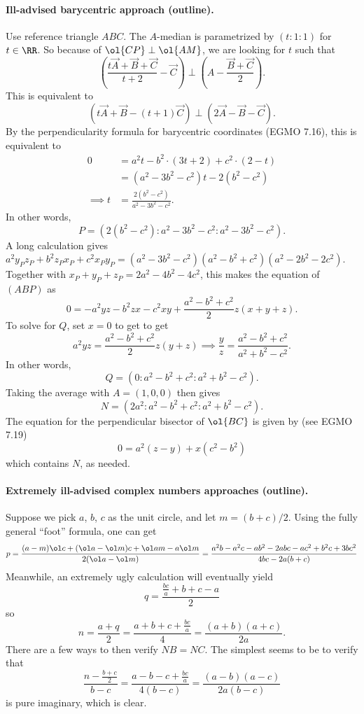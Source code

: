 \documentclass[11pt]{scrartcl}
\begin{document}
\paragraph{Ill-advised barycentric approach (outline).}
Use reference triangle $ABC$.
The $A$-median is parametrized by $(t:1:1)$ for $t \in \RR$.
So because of $\ol{CP} \perp \ol{AM}$, we are looking for $t$ such that
\[
  \left( \frac{t \vec A + \vec B + \vec C}{t+2} - \vec C \right)
  \perp \left( A - \frac{\vec B + \vec C}{2} \right).
\]
This is equivalent to
\[
  \left( t \vec A + \vec B - (t+1) \vec C \right)
  \perp \left( 2 \vec A - \vec B - \vec C \right).
\]
By the perpendicularity formula for barycentric coordinates (EGMO 7.16),
this is equivalent to
\begin{align*}
  0 &= a^2t - b^2 \cdot (3t+2) + c^2 \cdot (2-t) \\
  &= \left( a^2-3b^2-c^2 \right) t - 2(b^2-c^2) \\
  \implies t &= \frac{2(b^2-c^2)}{a^2-3b^2-c^2}.
\end{align*}
In other words,
\[ P = \left( 2(b^2-c^2) : a^2-3b^2-c^2 : a^2-3b^2-c^2 \right). \]
A long calculation gives
$a^2 y_P z_P + b^2 z_P x_P + c^2 x_P y_P
= (a^2-3b^2-c^2)(a^2-b^2+c^2)(a^2-2b^2-2c^2)$.
Together with $x_P+y_P+z_P=2a^2-4b^2-4c^2$,
this makes the equation of $(ABP)$ as
\[
  0=-a^2yz-b^2zx-c^2xy
  + \frac{a^2-b^2+c^2}{2} z(x+y+z).
\]
To solve for $Q$, set $x=0$ to get to get
\[ a^2yz = \frac{a^2-b^2+c^2}{2} z(y+z)
  \implies \frac yz = \frac{a^2-b^2+c^2}{a^2+b^2-c^2}. \]
In other words,
\[ Q = \left(  0 : a^2-b^2+c^2 : a^2+b^2-c^2 \right). \]
Taking the average with $A = (1,0,0)$ then gives
\[ N = \left(  2a^2 : a^2-b^2+c^2 : a^2+b^2-c^2 \right). \]
The equation for the perpendicular bisector of $\ol{BC}$
is given by (see EGMO 7.19)
\[ 0 = a^2(z-y)+x(c^2-b^2) \]
which contains $N$, as needed.

\paragraph{Extremely ill-advised complex numbers approaches (outline).}
Suppose we pick $a$, $b$, $c$ as the unit circle, and let $m = (b+c)/2$.
Using the fully general ``foot'' formula, one can get
\[
  p = \frac{(a-m) \ol c + (\ol a - \ol m)c
    + \ol a m - a \ol m}{2(\ol a - \ol m)}
    = \frac{a^2 b - a^2 c - a b^2 - 2 a b c - a c^2 + b^2 c + 3 b c^2}
    {4bc-2a(b+c)}
\]
Meanwhile, an extremely ugly calculation will eventually yield
\[ q = \frac{\frac{bc}{a}+b+c-a}{2} \]
so
\[ n = \frac{a+q}{2} = \frac{a+b+c+\frac{bc}{a}}{4}
  = \frac{(a+b)(a+c)}{2a}. \]
There are a few ways to then verify $NB = NC$.
The simplest seems to be to verify that
\[ \frac{n - \frac{b+c}{2}}{b-c} = \frac{a-b-c+\frac{bc}{a}}{4(b-c)}
  = \frac{(a-b)(a-c)}{2a(b-c)} \]
is pure imaginary, which is clear.
\pagebreak
\end{document}
